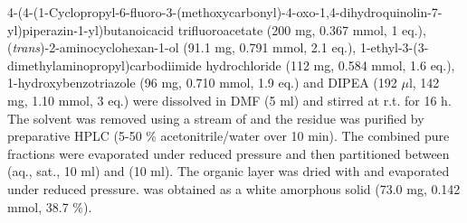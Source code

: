 {4\hyp{}(4\hyp{}(1\hyp{}Cyclopropyl\hyp{}6\hyp{}fluoro\hyp{}3\hyp{}(methoxycarbonyl)\hyp{}4\hyp{}oxo\hyp{}1,4\hyp{}dihydroquinolin\hyp{}7\hyp{}yl)piperazin\hyp{}1\hyp{}yl)butanoic\hfill acid trifluoroacetate  (200 mg, 0.367 mmol, 1 eq.), (\textit{trans})\hyp{}2\hyp{}aminocyclohexan\hyp{}1\hyp{}ol  (91.1 mg, 0.791 mmol, 2.1 eq.), 1-ethyl-3-(3-dimethylaminopropyl)carbodi\allowbreak imide hydrochloride (112 mg, 0.584 mmol, 1.6 eq.), 1-hydroxyben\allowbreak zotriazole (96 mg, 0.710 mmol, 1.9 eq.) and DIPEA (192 $\mu$l, 142 mg, 1.10 mmol, 3 eq.) were dissolved in DMF (5 ml) and stirred at r.t. for 16 h. The solvent was removed using a stream of  and the residue was purified by preparative HPLC (5-50 \% acetonitrile/water over 10 min). The combined pure fractions were evaporated under reduced pressure and then partitioned between  (aq., sat., 10 ml) and  (10 ml). The organic layer was dried with  and evaporated under reduced pressure.  was obtained as a white amorphous solid (73.0 mg, 0.142 mmol, 38.7 \%).
\\[1\baselineskip]
\\[1\baselineskip]
}
